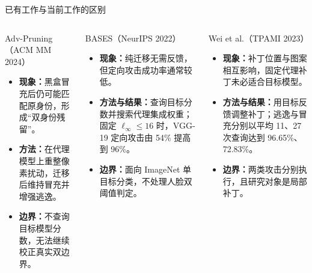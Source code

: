 \begin{frame}{已有工作与当前工作的区别}
  \scriptsize
  \vspace{-1.5em}
  \begin{columns}[T,onlytextwidth]
    \begin{block}{Adv-Pruning（ACM MM 2024）}
      \begin{itemize}\setlength{\itemsep}{1pt}\setlength{\parskip}{0pt}
        \item \textbf{现象：}黑盒冒充后仍可能匹配原身份，形成“双身份残留”。
        \item \textbf{方法：}在代理模型上重整像素扰动，迁移后维持冒充并增强逃逸。
        \item \textbf{边界：}不查询目标模型分数，无法继续校正真实双边界。
      \end{itemize}
    \end{block}

    \begin{block}{BASES（NeurIPS 2022）}
      \begin{itemize}\setlength{\itemsep}{1pt}\setlength{\parskip}{0pt}
        \item \textbf{现象：}纯迁移无需反馈，但定向攻击成功率通常较低。
        \item \textbf{方法与结果：}查询目标分数并搜索代理集成权重；固定 $\ell_\infty\le16$ 时，VGG-19 定向攻击由 54\% 提高到 96\%。
        \item \textbf{边界：}面向 ImageNet 单目标分类，不处理人脸双阈值判定。
      \end{itemize}
    \end{block}

    \begin{block}{Wei et al.（TPAMI 2023）}
      \begin{itemize}\setlength{\itemsep}{1pt}\setlength{\parskip}{0pt}
        \item \textbf{现象：}补丁位置与图案相互影响，固定代理补丁未必适合目标模型。
        \item \textbf{方法与结果：}用目标反馈调整补丁；逃逸与冒充分别以平均 11、27 次查询达到 96.65\%、72.83\%。
        \item \textbf{边界：}两类攻击分别执行，且研究对象是局部补丁。
      \end{itemize}
    \end{block}
  \end{columns}


\end{frame}
